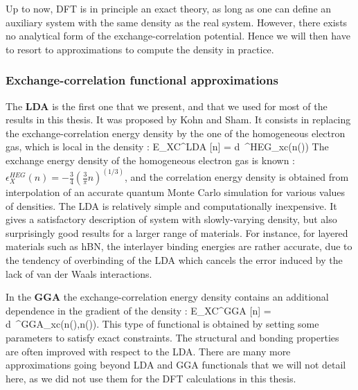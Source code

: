 Up to now, \acrshort{DFT} is in principle an exact theory, as long as one can define an auxiliary system with the same density as the real system. However, there exists no analytical form of the exchange-correlation potential. Hence we will then have to resort to approximations to compute the density in practice.

\subsubsection{Exchange-correlation functional approximations}
The \textbf{\acrfull{LDA}} is the first one that we present, and that we used for most of the results in this thesis. It was proposed by Kohn and Sham.\cite{kohn1965} It consists in replacing the exchange-correlation energy density by the one of the homogeneous electron gas, which is local in the density :
\be
	E_{XC}^{LDA} [n] = \int d\rr \ \epsilon^{HEG}_{xc}(n(\rr))
\ee
The exchange energy density of the homogeneous electron gas is known : $\epsilon_X^{HEG}(n) = -\tfrac{3}{4}(\tfrac{3}{\pi}n)^{(1/3)}$, and the correlation energy density is obtained from interpolation of an accurate quantum Monte Carlo simulation for various values of densities.\cite{ceperley1980ground} The LDA is relatively simple and computationally inexpensive. It gives a satisfactory description of system with slowly-varying density, but also surprisingly good results for a larger range of materials. For instance, for layered materials such as hBN, the interlayer binding energies are rather accurate, due to the tendency of overbinding of the LDA which cancels the error induced by the lack of van der Waals interactions.

In the \textbf{\acrfull{GGA}} the exchange-correlation energy density contains an additional dependence in the gradient of the density :
\be
 	E_{XC}^{GGA} [n] = \int d\rr \ \epsilon^{GGA}_{xc}(n(\rr),\nabla n(\rr)).
\ee
This type of functional is obtained by setting some parameters to satisfy exact constraints. The structural and bonding properties are often improved with respect to the \acrshort{LDA}.
There are many more approximations going beyond LDA and GGA functionals that we will not detail here,\cite{martin2020electronic} as we did not use them for the DFT calculations in this thesis.
%

